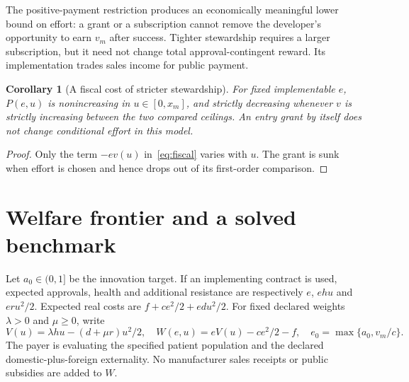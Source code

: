 \documentclass[11pt,a4paper]{article}
\newtheorem{corollary}[theorem]{Corollary}
\theoremstyle{definition}
\theoremstyle{remark}
\begin{document}
The positive-payment restriction produces an economically meaningful lower bound on effort: a grant or a subscription cannot remove the developer's opportunity to earn $v_m$ after success. Tighter stewardship requires a larger subscription, but it need not change total approval-contingent reward. Its implementation trades sales income for public payment.

\begin{corollary}[A fiscal cost of stricter stewardship]
For fixed implementable $e$, $P(e,u)$ is nonincreasing in $u\in[0,x_m]$, and strictly decreasing whenever $v$ is strictly increasing between the two compared ceilings. An entry grant by itself does not change conditional effort in this model.
\end{corollary}
\begin{proof}
Only the term $-ev(u)$ in~\eqref{eq:fiscal} varies with $u$. The grant is sunk when effort is chosen and hence drops out of its first-order comparison.
\end{proof}

\section{Welfare frontier and a solved benchmark}
Let $a_0\in(0,1]$ be the innovation target. If an implementing contract is used, expected approvals, health and additional resistance are respectively $e$, $ehu$ and $eru^2/2$. Expected real costs are $f+ce^2/2+edu^2/2$. For fixed declared weights $\lambda>0$ and $\mu\geq0$, write
\[
 V(u)=\lambda hu-(d+\mu r)u^2/2,\quad
 W(e,u)=eV(u)-ce^2/2-f,\quad
 e_0=\max\{a_0,v_m/c\}.
\]
The payer is evaluating the specified patient population and the declared domestic-plus-foreign externality. No manufacturer sales receipts or public subsidies are added to $W$.
\end{document}
